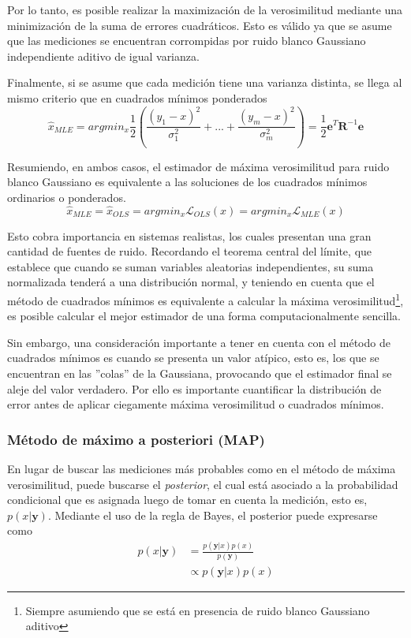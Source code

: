 Por lo tanto, es posible realizar la maximización de la verosimilitud mediante una minimización de la suma de errores cuadráticos. Esto es válido ya que se asume que las mediciones se encuentran corrompidas por ruido blanco Gaussiano independiente aditivo de igual varianza.

Finalmente, si se asume que cada medición tiene una varianza distinta, se llega al mismo criterio que en cuadrados mínimos ponderados
\begin{equation}
    \hat{x}_{MLE} = argmin_x \frac{1}{2}\left(\frac{(y_1-x)^2}{\sigma_1^2}+...+\frac{(y_m-x)^2}{\sigma_m^2}\right) =\frac{1}{2} \bm{e}^T\bm{R}^{-1}\bm{e}
    \label{eq:mlewls}
\end{equation}

Resumiendo, en ambos casos, el estimador de máxima verosimilitud para ruido blanco Gaussiano es equivalente a las soluciones de los cuadrados mínimos ordinarios o ponderados.
\begin{equation}
    \hat{x}_{MLE} = \hat{x}_{OLS} = argmin_x\mathscr{L}_{OLS}(x) = argmin_x\mathscr{L}_{MLE}(x)
\end{equation}

Esto cobra importancia en sistemas realistas, los cuales presentan una gran cantidad de fuentes de ruido. Recordando el teorema central del límite, que establece que cuando se suman variables aleatorias independientes, su suma normalizada tenderá a una distribución normal, y teniendo en cuenta que el método de cuadrados mínimos es equivalente a calcular la máxima verosimilitud\footnote{Siempre asumiendo que se está en presencia de ruido blanco Gaussiano aditivo}, es posible calcular el mejor estimador de una forma computacionalmente sencilla.

Sin embargo, una consideración importante a tener en cuenta con el método de cuadrados mínimos es cuando se presenta un valor atípico, esto es, los que se encuentran en las ''colas'' de la Gaussiana, provocando que el estimador final se aleje del valor verdadero. Por ello es importante cuantificar la distribución de error antes de aplicar ciegamente máxima verosimilitud o cuadrados mínimos.

\subsubsection{Método de máximo a posteriori (MAP)}
En lugar de buscar las mediciones más probables como en el método de máxima verosimilitud, puede buscarse el \textit{posterior}, el cual está asociado a la probabilidad condicional que es asignada luego de tomar en cuenta la medición, esto es, $p(x|\bm{y})$. Mediante el uso de la regla de Bayes, el posterior puede expresarse como
\begin{align}
    p(x|\bm{y}) &= \frac{p(\bm{y}|x)p(x)}{p(\bm{y})} 
    \label{eq:posteriorfull}\\
    &\propto p(\bm{y}|x)p(x)
    \label{eq:posterior}
\end{align}

